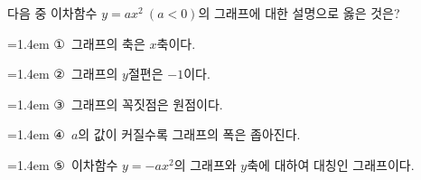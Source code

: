 다음 중 이차함수 $y=ax^2\ (a<0)$의 그래프에 대한 설명으로 옳은 것은?
\par\medskip\par\noindent\hangindent=1.4em {\small ①}\ 그래프의 축은 $x$축이다.\par\noindent\hangindent=1.4em {\small ②}\ 그래프의 $y$절편은 $-1$이다.\par\noindent\hangindent=1.4em {\small ③}\ 그래프의 꼭짓점은 원점이다.\par\noindent\hangindent=1.4em {\small ④}\ $a$의 값이 커질수록 그래프의 폭은 좁아진다.\par\noindent\hangindent=1.4em {\small ⑤}\ 이차함수 $y=-ax^2$의 그래프와 $y$축에 대하여 대칭인 그래프이다.\par\medskip
